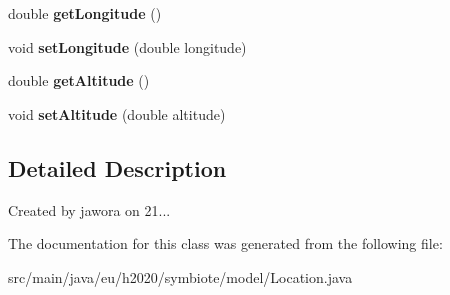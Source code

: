 \begin{DoxyCompactItemize}
double {\bfseries get\+Longitude} ()
\item 
\mbox{\label{classeu_1_1h2020_1_1symbiote_1_1model_1_1Location_a6bc9a04947915ea52001bccbcba0849e}} 
void {\bfseries set\+Longitude} (double longitude)
\item 
\mbox{\label{classeu_1_1h2020_1_1symbiote_1_1model_1_1Location_a333c37abcd3c9ea766ca5ec6dddd5e3a}} 
double {\bfseries get\+Altitude} ()
\item 
\mbox{\label{classeu_1_1h2020_1_1symbiote_1_1model_1_1Location_ac2fc6d59229ad7253416f2fdf650675d}} 
void {\bfseries set\+Altitude} (double altitude)
\end{DoxyCompactItemize}


\subsection{Detailed Description}
Created by jawora on 21... 

The documentation for this class was generated from the following file\+:\begin{DoxyCompactItemize}
\item 
src/main/java/eu/h2020/symbiote/model/Location.\+java\end{DoxyCompactItemize}
